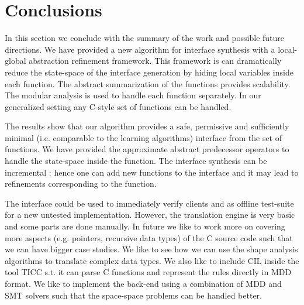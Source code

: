 \documentclass{llncs}
\begin{document}
 
\section{Conclusions}
In this section we conclude with the summary of the work and possible future directions.
We have provided a new algorithm for interface synthesis with a  local-global abstraction refinement 
framework.
This framework is can dramatically reduce the state-space of the interface generation by hiding
local variables inside each function.
The abstract summarization of the functions provides scalability. 
The modular analysis is used to handle each function separately.
In our generalized setting any C-style set of functions can be handled.
 

The results show that our algorithm provides a safe, permissive and sufficiently minimal (i.e. comparable to the learning algorithms) interface from the set of functions.
 We have provided the approximate abstract predecessor operators to handle the state-space inside
 the function.
 The interface synthesis can be incremental : hence one can add new functions to the interface 
 and it may lead to refinements corresponding to the function.
 
 
 The interface could be used to immediately verify clients and  as offline test-suite for a new untested  implementation.
 However, the translation engine is very basic and some parts are done manually.
In future we like to work more on covering more aspects (e.g. pointers, recursive data types) of the 
C source code such that we can have bigger case studies.
We like to see how we can use the shape analysis algorithms to translate complex data types.
We also like to include CIL inside the tool TICC s.t. it can parse C functions and represent the rules directly in MDD format.
We like to implement the back-end using a combination of MDD and SMT solvers such that the 
space-space problems can be handled better.



 
 
\end{document}
